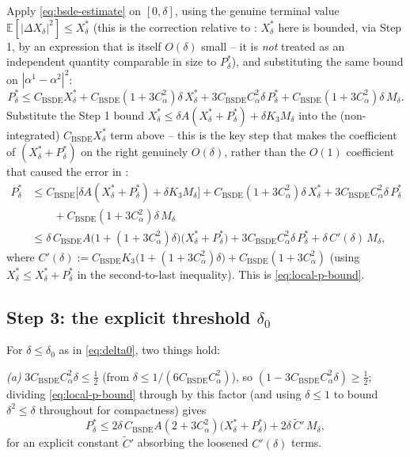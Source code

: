 \documentclass[11pt]{article}
\theoremstyle{remark}
\begin{document}
Apply \eqref{eq:bsde-estimate} on $[0,\delta]$, using the genuine terminal value
$\mathbb{E}[|\Delta X_\delta|^2] \le X^*_\delta$ (this is the correction relative to
: $X^*_\delta$ here is bounded, via Step 1, by an expression that
is itself $O(\delta)$ small -- it is \emph{not} treated as an independent quantity
comparable in size to $P^*_\delta$), and substituting the same bound on
$|\alpha^1-\alpha^2|^2$:
\[
    P^*_\delta \le C_{\mathrm{BSDE}} X^*_\delta + C_{\mathrm{BSDE}}(1+3C_\alpha^2)
    \delta\, X^*_\delta + 3C_{\mathrm{BSDE}}C_\alpha^2 \delta\, P^*_\delta +
    C_{\mathrm{BSDE}}(1+3C_\alpha^2)\delta\, M_\delta.
\]
Substitute the Step 1 bound $X^*_\delta \le \delta A(X^*_\delta+P^*_\delta) + \delta
K_3 M_\delta$ into the (non-integrated) $C_{\mathrm{BSDE}} X^*_\delta$ term above --
this is the key step that makes the coefficient of $(X^*_\delta+P^*_\delta)$ on the
right genuinely $O(\delta)$, rather than the $O(1)$ coefficient that caused the
error in :
\begin{align*}
    P^*_\delta &\le C_{\mathrm{BSDE}}\Big[\delta A(X^*_\delta+P^*_\delta) + \delta K_3
    M_\delta\Big] + C_{\mathrm{BSDE}}(1+3C_\alpha^2)\delta\, X^*_\delta +
    3C_{\mathrm{BSDE}}C_\alpha^2\delta\, P^*_\delta \\
    &\qquad + C_{\mathrm{BSDE}}(1+3C_\alpha^2)\delta\, M_\delta \\
    &\le \delta\, C_{\mathrm{BSDE}} A\big(1+(1+3C_\alpha^2)\delta\big)
    \big(X^*_\delta+P^*_\delta\big) + 3C_{\mathrm{BSDE}}C_\alpha^2\delta\, P^*_\delta
    + \delta\, C'(\delta)\, M_\delta,
\end{align*}
where $C'(\delta) := C_{\mathrm{BSDE}} K_3\big(1+(1+3C_\alpha^2)\delta\big) +
C_{\mathrm{BSDE}}(1+3C_\alpha^2)$ (using $X^*_\delta \le X^*_\delta+P^*_\delta$ in
the second-to-last inequality). This is \eqref{eq:local-p-bound}.

\subsection{Step 3: the explicit threshold $\delta_0$}

For $\delta \le \delta_0$ as in \eqref{eq:delta0}, two things hold:

\emph{(a)} $3C_{\mathrm{BSDE}}C_\alpha^2\delta \le \tfrac12$ (from $\delta \le
1/(6C_{\mathrm{BSDE}}C_\alpha^2)$), so $(1-3C_{\mathrm{BSDE}}C_\alpha^2\delta) \ge
\tfrac12$; dividing \eqref{eq:local-p-bound} through by this factor (and using
$\delta \le 1$ to bound $\delta^2 \le \delta$ throughout for compactness) gives
\[
    P^*_\delta \le 2\delta\, C_{\mathrm{BSDE}}A(2+3C_\alpha^2)
    \big(X^*_\delta+P^*_\delta\big) + 2\delta\, \widetilde{C}'\, M_\delta,
\]
for an explicit constant $\widetilde{C}'$ absorbing the loosened $C'(\delta)$ terms.
\end{document}
